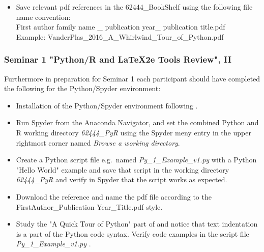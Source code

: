 \documentclass{beamer}
\begin{document}
\begin{frame}[fragile, label={ToolReview}]
{\begin{itemize}
\item Save relevant pdf references in the 62444\_BookShelf using the following file name convention:\\ 
First author family name \_ publication year\_ publication title.pdf\\
Example: VanderPlas\_2016\_A\_Whirlwind\_Tour\_of\_Python.pdf
\end{itemize}
}
\end{frame}


\begin{frame}[fragile, label={ToolReview}]
\frametitle{Seminar 1 "Python/R and \LaTeX2e \hspace*{0.5mm} Tools Review", II}
\scriptsize{

Furthermore in preparation for Seminar 1 each participant should have completed the following for the Python/Spyder environment:
\begin{itemize}
\item Installation of the Python/Spyder environment following \cite{Anaconda2022}.
\item Run Spyder from the Anaconda Navigator, and set the combined Python and R working directory \emph{62444\_PyR} using the Spyder meny entry in the upper rightmost corner named \emph{Browse a working directory}.
\item Create a Python script file e.g.\ named \emph{Py\_1\_Example\_v1.py} with a Python "Hello World" example and save that script in the working directory \emph{62444\_PyR} and verify in Spyder that the script works as expected.
\item Download the reference \cite{VanderPlas2016} and name the pdf file according to the FirstAuthor\_Publication Year\_Title.pdf style.
\item Study the "A Quick Tour of Python" part of \cite{VanderPlas2016} and notice that text indentation is a part of the Python code syntax. Verify code examples in the script file \emph{Py\_1\_Example\_v1.py} .
\end{itemize}

}
\end{frame}

\end{document}
